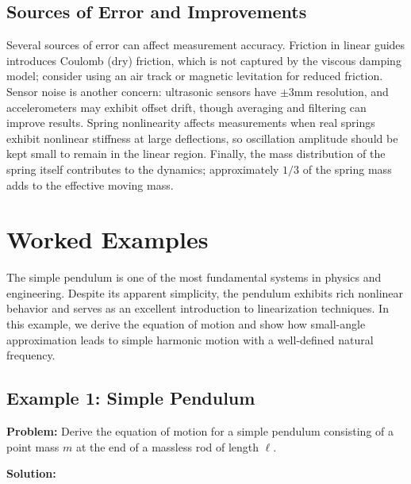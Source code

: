 \subsection{Sources of Error and Improvements}

Several sources of error can affect measurement accuracy. Friction in linear guides introduces Coulomb (dry) friction, which is not captured by the viscous damping model; consider using an air track or magnetic levitation for reduced friction. Sensor noise is another concern: ultrasonic sensors have $\pm$3mm resolution, and accelerometers may exhibit offset drift, though averaging and filtering can improve results. Spring nonlinearity affects measurements when real springs exhibit nonlinear stiffness at large deflections, so oscillation amplitude should be kept small to remain in the linear region. Finally, the mass distribution of the spring itself contributes to the dynamics; approximately $1/3$ of the spring mass adds to the effective moving mass.


\section{Worked Examples}

\begin{examplebox}
The simple pendulum is one of the most fundamental systems in physics and engineering. Despite its apparent simplicity, the pendulum exhibits rich nonlinear behavior and serves as an excellent introduction to linearization techniques. In this example, we derive the equation of motion and show how small-angle approximation leads to simple harmonic motion with a well-defined natural frequency.
\end{examplebox}

\subsection{Example 1: Simple Pendulum}

\textbf{Problem:} Derive the equation of motion for a simple pendulum consisting of a point mass $m$ at the end of a massless rod of length $\ell$.

\textbf{Solution:}

